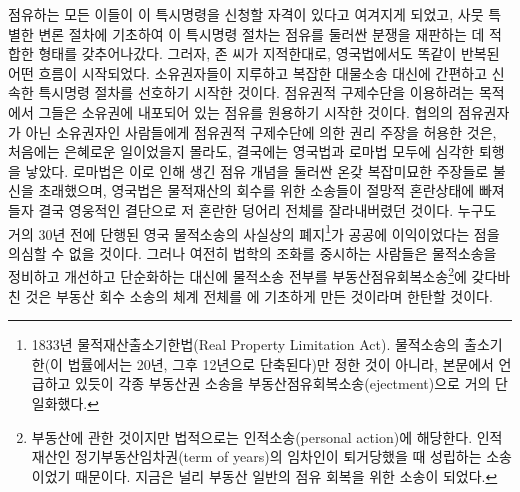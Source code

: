 점유하는 모든 이들이 이 특시명령을 신청할 자격이 있다고
여겨지게 되었고,
사뭇 특별한 변론 절차에 기초하여
이 특시명령 절차는 점유를 둘러싼 분쟁을 재판하는 데 적합한 형태를
갖추어나갔다.
그러자, 존  씨가 지적한대로,
영국법에서도 똑같이 반복된 어떤 흐름이 시작되었다.
소유권자들이
지루하고 복잡한 대물소송 대신에
간편하고 신속한 특시명령 절차를 선호하기 시작한 것이다.
점유권적 구제수단을 이용하려는 목적에서
그들은 소유권에 내포되어 있는 점유를 원용하기 시작한 것이다.
협의의 점유권자가 아닌 소유권자인 사람들에게
점유권적 구제수단에 의한 권리 주장을 허용한 것은,
처음에는 은혜로운 일이었을지 몰라도,
결국에는 영국법과 로마법 모두에 심각한 퇴행을 낳았다.
로마법은
이로 인해 생긴
점유 개념을 둘러싼 온갖 복잡미묘한 주장들로
불신을 초래했으며,
영국법은
물적재산의 회수를 위한 소송들이
절망적 혼란상태에 빠져들자
결국 영웅적인 결단으로
저 혼란한 덩어리 전체를 잘라내버렸던 것이다.
누구도 거의 30년 전에 단행된
영국 물적소송의 사실상의 폐지\footnote{%
  1833년 물적재산출소기한법(Real Property Limitation Act).
  물적소송의 출소기한(이 법률에서는 20년, 그후 12년으로 단축된다)만
  정한 것이 아니라, 본문에서 언급하고 있듯이
  각종 부동산권 소송을 부동산점유회복소송(ejectment)으로 거의 단일화했다.
}가 공공에 이익이었다는 점을 의심할 수 없을 것이다.
그러나 여전히
법학의 조화를 중시하는 사람들은
물적소송을
정비하고 개선하고 단순화하는 대신에
물적소송 전부를 부동산점유회복소송\footnote{%
  부동산에 관한 것이지만 법적으로는 인적소송(personal action)에
  해당한다. 인적재산인 정기부동산임차권(term of years)의 임차인이
  퇴거당했을 때 성립하는 소송이었기 때문이다.
  지금은 널리 부동산 일반의 점유 회복을 위한 소송이 되었다.
}에 갖다바친 것은
부동산 회수 소송의 체계 전체를 에 기초하게 만든 것이라며
한탄할 것이다.

